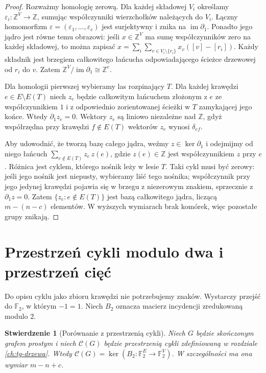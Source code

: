 \documentclass[11pt,a4paper]{report}
\numberwithin{equation}{section}
\theoremstyle{plain}
\newtheorem{stwierdzenie}[twierdzenie]{Stwierdzenie}
\theoremstyle{definition}
\theoremstyle{remark}
\begin{document}
\begin{proof}
Rozważmy homologię zerową. Dla każdej składowej $V_i$ określamy
$\varepsilon_i:\mathbb Z^V\to\mathbb Z$, sumując współczynniki
wierzchołków należących do $V_i$. Łączny homomorfizm
$\varepsilon=(\varepsilon_1,\ldots,\varepsilon_c)$ jest surjektywny
i znika na $\operatorname{im}\partial_1$. Ponadto jego jądro jest
równe temu obrazowi: jeśli $x\in\mathbb Z^V$ ma sumę współczynników
zero na każdej składowej, to można zapisać
$x=\sum_i\sum_{v\in V_i\setminus\{r_i\}}x_v([v]-[r_i])$.
Każdy składnik jest brzegiem całkowitego łańcucha odpowiadającego
ścieżce drzewowej od $r_i$ do $v$. Zatem
$\mathbb Z^V/\operatorname{im}\partial_1\cong\mathbb Z^c$.

Dla homologii pierwszej wybieramy las rozpinający $T$.
Dla każdej krawędzi $e\in E\setminus E(T)$ niech $z_e$
będzie całkowitym łańcuchem złożonym z $e$ ze współczynnikiem
$1$ i z odpowiednio zorientowanej ścieżki w $T$ zamykającej jego
końce. Wtedy $\partial_1z_e=0$. Wektory $z_e$ są liniowo
niezależne nad $\mathbb Z$, gdyż współrzędna przy krawędzi
$f\notin E(T)$ wektorów $z_e$ wynosi $\delta_{ef}$.

Aby udowodnić, że tworzą bazę całego jądra, weźmy
$z\in\ker\partial_1$ i odejmijmy od niego łańcuch
$\sum_{e\notin E(T)}z_e\,z(e)$, gdzie $z(e)\in\mathbb Z$
jest współczynnikiem $z$ przy $e$. Różnica jest cyklem,
którego nośnik leży w lesie $T$. Taki cykl musi być zerowy:
jeśli jego nośnik jest niepusty, wybieramy liść tego nośnika;
współczynnik przy jego jedynej krawędzi pojawia się w brzegu
z niezerowym znakiem, sprzecznie z $\partial_1z=0$.
Zatem $\{z_e:e\notin E(T)\}$ jest bazą całkowitego
jądra, liczącą $m-(n-c)$ elementów. W wyższych wymiarach
brak komórek, więc pozostałe grupy znikają.
\end{proof}

\section{Przestrzeń cykli modulo dwa i przestrzeń cięć}
\label{sec:tg-cut-cycle}

Do opisu cyklu jako zbioru krawędzi nie potrzebujemy znaków.
Wystarczy przejść do $\mathbb F_2$, w którym $-1=1$.
Niech $B_2$ oznacza macierz incydencji zredukowaną modulo $2$.

\begin{stwierdzenie}[Porównanie z przestrzenią cykli]
Niech $G$ będzie skończonym grafem prostym i niech
$\mathcal C(G)$ będzie przestrzenią cykli zdefiniowaną
w rozdziale \ref{ch:tg-drzewa}. Wtedy
$\mathcal C(G)=\ker(B_2:\mathbb F_2^E\to\mathbb F_2^V)$.
W szczególności ma ona wymiar $m-n+c$.
\end{stwierdzenie}
\end{document}
